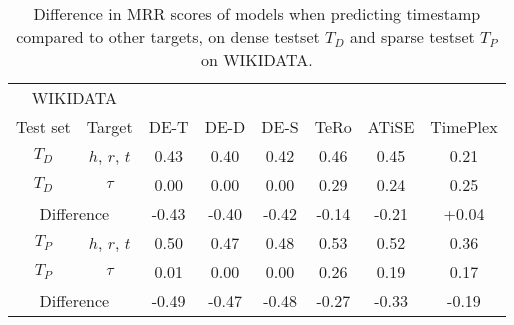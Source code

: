 \begin{table}[htb]
\centering
\begin{minipage}{\columnwidthcaption}
\centering
\caption{Difference in MRR scores of models when predicting timestamp compared to other targets, on dense testset $T_D$ and sparse testset $T_P$ on WIKIDATA.}
\label{tab:time_density_timestamp_wikidata}
\end{minipage}
\vspace{-3mm}

\begin{tabular}{cc|cccccc} \hline
\multicolumn{2}{c|}{WIKIDATA} & & & & & & \\
Test set & Target & 
DE-T & DE-D & DE-S & TeRo & ATiSE & TimePlex \\ \hline 
$T_D$ & $h$, $r$, $t$ & 
0.43 & 0.40 & 0.42 & 0.46 & 0.45 & 0.21 \\
$T_D$ & $\tau$        & 
0.00 & 0.00 & 0.00 & 0.29 & 0.24 & 0.25 \\ \hline
\multicolumn{2}{c|}{Difference} & 
-0.43 & -0.40 & -0.42 & -0.14 & -0.21 & +0.04 \\ \hline\hline
$T_P$ & $h$, $r$, $t$ & 
0.50 & 0.47 & 0.48 & 0.53 & 0.52 & 0.36 \\
$T_P$ & $\tau$        & 
0.01 & 0.00 & 0.00 & 0.26 & 0.19 & 0.17 \\ \hline 
\multicolumn{2}{c|}{Difference} & 
-0.49 & -0.47 & -0.48 & -0.27 & -0.33 & -0.19 \\ \hline
\end{tabular}

\end{table}

